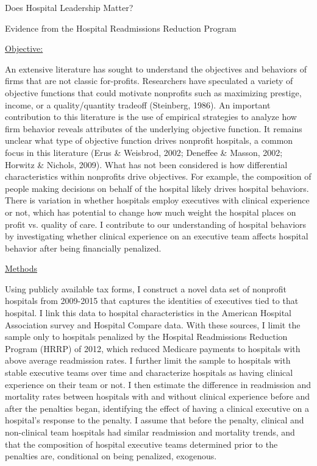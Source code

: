 \documentclass[12pt]{article}
\begin{document}
\large 
\begin{center}
    Does Hospital Leadership Matter? 
    \normalsize \vspace{-1mm}
    
    Evidence from the Hospital Readmissions Reduction Program
\end{center}

\normalsize

\noindent \underline{Objective:}

An extensive literature has sought to understand the objectives and behaviors of firms that are not classic for-profits. Researchers have speculated a variety of objective functions that could motivate nonprofits such as maximizing prestige, income, or a quality/quantity tradeoff (Steinberg, 1986). An important contribution to this literature is the use of empirical strategies to analyze how firm behavior reveals attributes of the underlying objective function. It remains unclear what type of objective function drives nonprofit hospitals, a common focus in this literature (Erus \& Weisbrod, 2002; Deneffee \& Masson, 2002; Horwitz \& Nichols, 2009). What has not been considered is how differential characteristics within nonprofits drive objectives. For example, the composition of people making decisions on behalf of the hospital likely drives hospital behaviors. There is variation in whether hospitals employ executives with clinical experience or not, which has potential to change how much weight the hospital places on profit vs. quality of care. I contribute to our understanding of hospital behaviors by investigating whether clinical experience on an executive team affects hospital behavior after being financially penalized.

\vspace{2mm}

\noindent \underline{Methods}

Using publicly available tax forms, I construct a novel data set of nonprofit hospitals from 2009-2015 that captures the identities of executives tied to that hospital. I link this data to hospital characteristics in the American Hospital Association survey and Hospital Compare data. With these sources, I limit the sample only to hospitals penalized by the Hospital Readmissions Reduction Program (HRRP) of 2012, which reduced Medicare payments to hospitals with above average readmission rates. I further limit the sample to hospitals with stable executive teams over time and characterize hospitals as having clinical experience on their team or not. I then estimate the difference in readmission and mortality rates between hospitals with and without clinical experience before and after the penalties began, identifying the effect of having a clinical executive on a hospital’s response to the penalty. I assume that before the penalty, clinical and non-clinical team hospitals had similar readmission and mortality trends, and that the composition of hospital executive teams determined prior to the penalties are, conditional on being penalized, exogenous.
\end{document}

